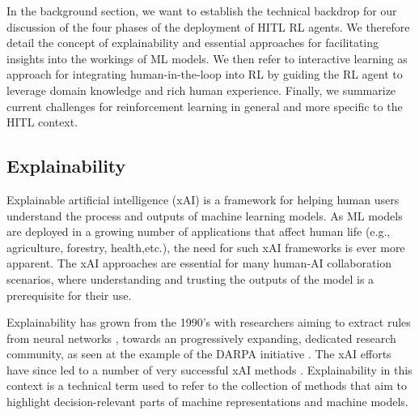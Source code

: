 \documentclass[twoside,11pt]{article}
\begin{document}
In the background section, we want to establish the technical backdrop for our discussion of the four phases of the deployment of HITL RL agents. We therefore detail the concept of explainability and essential approaches for facilitating insights into the workings of ML models. We then refer to interactive learning as  approach for integrating human-in-the-loop into RL by guiding the RL agent to leverage domain knowledge and rich human experience. Finally, we summarize current challenges for reinforcement learning in general and more specific to the HITL context.

\subsection{Explainability}

Explainable artificial intelligence (xAI) is a framework for helping human users understand the process and outputs of machine learning models. As ML models are deployed in a growing number of applications that affect human life (e.g., agriculture, forestry, health,etc.), the need for such xAI frameworks is ever more apparent. The xAI approaches are essential for many human-AI collaboration scenarios, where understanding and trusting the outputs of the model is a prerequisite for their use.  

Explainability has grown from the 1990's with researchers aiming to extract rules from neural networks \citep{TickleEtAl:1998:HistoryNN}, towards an progressively expanding, dedicated research community, as seen at the example of the DARPA initiative \citep{GunningAha:2019:DARPA}. The xAI efforts have since led to a number of very successful xAI methods \citep{HolzWoj:2022:XAIOverview, ZhouEtAl:2021:QualitySurvey}. Explainability in this context is a technical term used to refer to the collection of methods that aim to highlight decision-relevant parts of machine representations and machine models.
\end{document}
